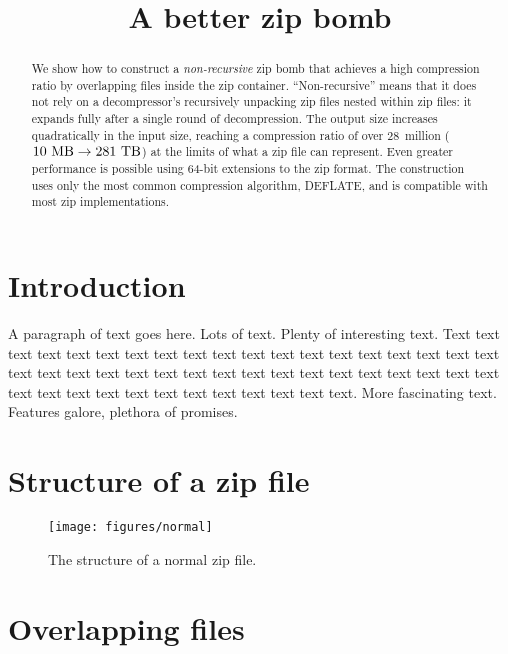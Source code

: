 \documentclass[letterpaper,twocolumn,10pt]{article}
\newcommand{\MB}{\mega\byte}
\newcommand{\TB}{\tera\byte}
\begin{document}
\date{}

\title{\Large \bf A better zip bomb}

\author{
}

\maketitle

\begin{abstract}
We show how to construct a
\emph{non-recursive} zip bomb
that achieves a high compression ratio by
overlapping files inside the zip container.
``Non-recursive'' means that it does not rely on
a decompressor's recursively unpacking zip files nested within zip files:
it expands fully after a single round of decompression.
The output size increases quadratically in the input size,
reaching a compression ratio of over 28~million
($\SI{10}{\MB} \rightarrow \SI{281}{\TB}$)
at the limits of what a zip file can represent.
Even greater performance is possible using
64-bit extensions to the zip format.
The construction uses only the most common compression algorithm, DEFLATE,
and is compatible with most zip implementations.
\end{abstract}


\section{Introduction}

A paragraph of text goes here. Lots of text. Plenty of interesting
text. Text text text text text text text text text text text text text
text text text text text text text text text text text text text text
text text text text text text text text text text text text text text
text text text text text text text.
More fascinating text. Features galore, plethora of promises.

\cite{190996}

\section{Structure of a zip file}

\begin{figure*}
\texttt{[image: figures/normal]}
\caption{
The structure of a normal zip file.
}
\label{fig:normal}
\end{figure*}

\section{Overlapping files}
\end{document}
